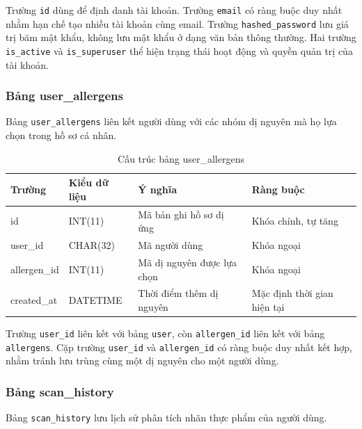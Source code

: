 Trường \texttt{id} dùng để định danh tài khoản. Trường \texttt{email} có ràng buộc duy nhất nhằm hạn chế tạo nhiều tài khoản cùng email. Trường \texttt{hashed\_password} lưu giá trị băm mật khẩu, không lưu mật khẩu ở dạng văn bản thông thường. Hai trường \texttt{is\_active} và \texttt{is\_superuser} thể hiện trạng thái hoạt động và quyền quản trị của tài khoản.

\subsubsection{Bảng user\_allergens}

Bảng \texttt{user\_allergens} liên kết người dùng với các nhóm dị nguyên mà họ lựa chọn trong hồ sơ cá nhân.

\begin{table}[H]
	\centering
	\caption{Cấu trúc bảng user\_allergens}
	\label{tab:user-allergens}
	\small
	\begin{tabularx}{\textwidth}{|l|l|X|l|}
		\hline
		\textbf{Trường} & \textbf{Kiểu dữ liệu} & \textbf{Ý nghĩa} & \textbf{Ràng buộc} \\
		\hline
		id & INT(11) & Mã bản ghi hồ sơ dị ứng & Khóa chính, tự tăng \\
		\hline
		user\_id & CHAR(32) & Mã người dùng & Khóa ngoại \\
		\hline
		allergen\_id & INT(11) & Mã dị nguyên được lựa chọn & Khóa ngoại \\
		\hline
		created\_at & DATETIME & Thời điểm thêm dị nguyên & Mặc định thời gian hiện tại \\
		\hline
	\end{tabularx}
\end{table}

Trường \texttt{user\_id} liên kết với bảng \texttt{user}, còn \texttt{allergen\_id} liên kết với bảng \texttt{allergens}. Cặp trường \texttt{user\_id} và \texttt{allergen\_id} có ràng buộc duy nhất kết hợp, nhằm tránh lưu trùng cùng một dị nguyên cho một người dùng.

\subsubsection{Bảng scan\_history}

Bảng \texttt{scan\_history} lưu lịch sử phân tích nhãn thực phẩm của người dùng.

